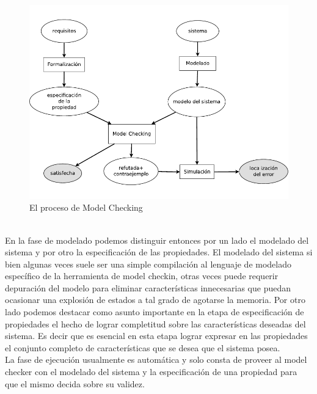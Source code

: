 \documentclass[titlepage, 12pt]{book}
\begin{document}
\begin{figure}[H]
  \centering
    \includegraphics{Imagenes/procesoMC4.pdf}
  \caption{El proceso de Model Checking}
  \label{ltsakripke}
\end{figure}
~\\


En la fase de modelado podemos distinguir entonces por un lado el modelado del sistema y por otro la especificaci\'on de las propiedades. El modelado del sistema si bien algunas veces suele ser una simple compilaci\'on al lenguaje de modelado espec\'ifico de la herramienta de model checkin, otras veces puede requerir depuraci\'on del modelo para eliminar caracter\'isticas innecesarias que puedan ocasionar una explosi\'on de estados a tal grado de agotarse la memoria. Por otro lado podemos destacar como asunto importante en la etapa de especificaci\'on de propiedades el hecho de lograr completitud sobre las caracter\'isticas deseadas del sistema. Es decir que es esencial en esta etapa lograr expresar en las propiedades el conjunto completo de caracter\'isticas que se desea que el sistema posea.\\

La fase de ejecuci\'on usualmente es autom\'atica y solo consta de proveer al model checker con el modelado del sistema y la especificaci\'on de una propiedad para que el mismo decida sobre su validez.\\
\end{document}
